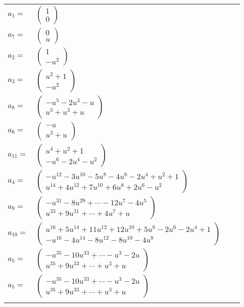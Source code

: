 \documentclass[1p]{elsarticle_modified}
\theoremstyle{definition}
\begin{document}
\begin{tabular}{m{7pt} m{180pt} m{7pt} m{180pt} }
\flushright $a_{1}=$&$\begin{pmatrix}1\\0\end{pmatrix}$ \\
\flushright $a_{7}=$&$\begin{pmatrix}0\\u\end{pmatrix}$ \\
\flushright $a_{2}=$&$\begin{pmatrix}1\\- u^2\end{pmatrix}$ \\
\flushright $a_{3}=$&$\begin{pmatrix}u^2+1\\- u^2\end{pmatrix}$ \\
\flushright $a_{8}=$&$\begin{pmatrix}- u^5-2 u^3- u\\u^5+u^3+u\end{pmatrix}$ \\
\flushright $a_{6}=$&$\begin{pmatrix}- u\\u^3+u\end{pmatrix}$ \\
\flushright $a_{11}=$&$\begin{pmatrix}u^4+u^2+1\\- u^6-2 u^4- u^2\end{pmatrix}$ \\
\flushright $a_{4}=$&$\begin{pmatrix}- u^{12}-3 u^{10}-5 u^8-4 u^6-2 u^4+u^2+1\\u^{14}+4 u^{12}+7 u^{10}+6 u^8+2 u^6- u^2\end{pmatrix}$ \\
\flushright $a_{9}=$&$\begin{pmatrix}- u^{31}-8 u^{29}+\cdots-12 u^7-4 u^5\\u^{33}+9 u^{31}+\cdots+4 u^7+u\end{pmatrix}$ \\
\flushright $a_{10}=$&$\begin{pmatrix}u^{16}+5 u^{14}+11 u^{12}+12 u^{10}+5 u^8-2 u^6-2 u^4+1\\- u^{16}-4 u^{14}-8 u^{12}-8 u^{10}-4 u^8\end{pmatrix}$ \\
\flushright $a_{5}=$&$\begin{pmatrix}- u^{35}-10 u^{33}+\cdots- u^3-2 u\\u^{35}+9 u^{33}+\cdots+u^3+u\end{pmatrix}$\\ \flushright $a_{5}=$&$\begin{pmatrix}- u^{35}-10 u^{33}+\cdots- u^3-2 u\\u^{35}+9 u^{33}+\cdots+u^3+u\end{pmatrix}$\\&\end{tabular}
\end{document}
